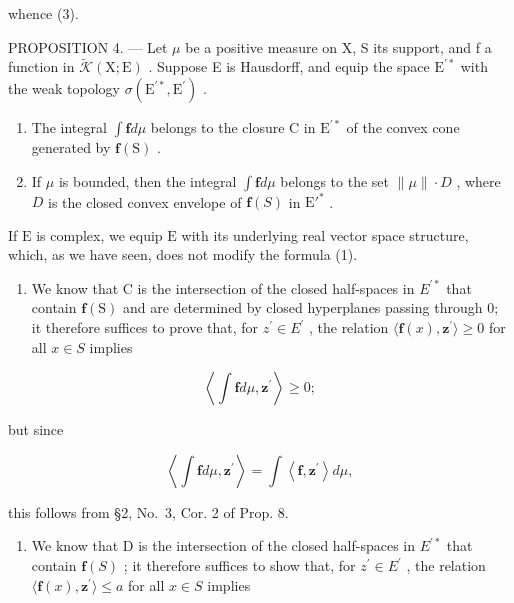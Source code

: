 whence (3).

PROPOSITION 4. --- Let \(\mu\) be a positive measure on X, S its support, and f a function in \(\widetilde{\mathcal{K}}(\mathrm{X};\mathrm{E})\) . Suppose E is Hausdorff, and equip the space \(\mathrm{E}^{\prime*}\) with the weak topology \(\sigma(\mathrm{E}^{\prime*},\mathrm{E}^{\prime})\) .

\begin{enumerate}
\def\labelenumi{(\roman{enumi})}
\item
  The integral \(\int \mathbf{f}d\mu\) belongs to the closure C in \(\mathrm{E}^{\prime *}\) of the convex cone generated by \(\mathbf{f}(\mathrm{S})\) .
\item
  If \(\mu\) is bounded, then the integral \(\int \mathbf{f} d\mu\) belongs to the set \(\| \mu \| \cdot D\) , where \(D\) is the closed convex envelope of \(\mathbf{f}(S)\) in \(\mathrm{E}'^*\) .
\end{enumerate}

If \(\mathrm{E}\) is complex, we equip \(\mathrm{E}\) with its underlying real vector space structure, which, as we have seen, does not modify the formula (1).

\begin{enumerate}
\def\labelenumi{(\roman{enumi})}
\tightlist
\item
  We know that C is the intersection of the closed half-spaces in \(E^{\prime*}\) that contain \(\mathbf{f}(\mathrm{S})\) and are determined by closed hyperplanes passing through 0; it therefore suffices to prove that, for \(z^{\prime} \in E^{\prime}\) , the relation \(\langle\mathbf{f}(x), \mathbf{z}^{\prime}\rangle \geqslant 0\) for all \(x \in S\) implies
\end{enumerate}

\[
\left\langle \int \mathbf {f} d \mu , \mathbf {z} ^ {\prime} \right\rangle \geqslant 0;
\]

but since

\[
\left\langle \int \mathbf {f} d \mu , \mathbf {z} ^ {\prime} \right\rangle = \int \left\langle \mathbf {f}, \mathbf {z} ^ {\prime} \right\rangle d \mu ,
\]

this follows from §2, No.~3, Cor. 2 of Prop. 8.

\begin{enumerate}
\def\labelenumi{(\roman{enumi})}
\setcounter{enumi}{1}
\tightlist
\item
  We know that D is the intersection of the closed half-spaces in \(E^{\prime*}\) that contain \(\mathbf{f}(S)\) ; it therefore suffices to show that, for \(z^{\prime} \in E^{\prime}\) , the relation \(\langle\mathbf{f}(x), \mathbf{z}^{\prime}\rangle \leqslant a\) for all \(x \in S\) implies
\end{enumerate}

